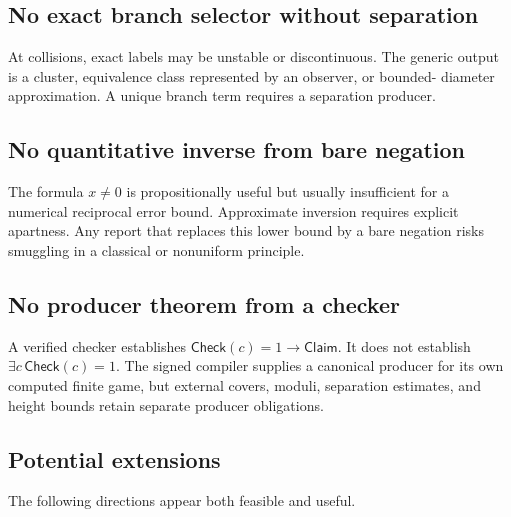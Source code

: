 \subsection{No exact branch selector without separation}

At collisions, exact labels may be unstable or discontinuous.  The generic
output is a cluster, equivalence class represented by an observer, or bounded-
diameter approximation.  A unique branch term requires a separation producer.

\subsection{No quantitative inverse from bare negation}

The formula \(x\ne0\) is propositionally useful but usually insufficient for a
numerical reciprocal error bound.  Approximate inversion requires explicit
apartness.  Any report that replaces this lower bound by a bare negation risks
smuggling in a classical or nonuniform principle.

\subsection{No producer theorem from a checker}

A verified checker establishes
\(\mathsf{Check}(c)=1\to\mathsf{Claim}\).  It does not establish
\(\exists c\,\mathsf{Check}(c)=1\).  The signed compiler supplies a canonical
producer for its own computed finite game, but external covers, moduli,
separation estimates, and height bounds retain separate producer obligations.

\subsection{Potential extensions}

The following directions appear both feasible and useful.

